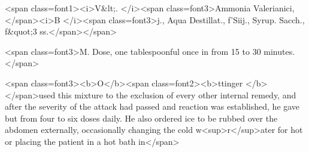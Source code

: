 <span class=font1><i>V&lt;.   </i><span class=font3>Ammonia Valerianici, </span><i>B </i><span class=font3>j.,
Aqua Destillat., f'Siij.,
Syrup. Sacch., f&quot;3 ss.</span></span>

<span class=font3>M.   Dose, one tablespoonful once in from 15 to 30 minutes.</span>

<span class=font3><b>O</b><span class=font2><b>ttinger </b></span>used this mixture to the exclusion of every other internal
remedy, and after the severity of the attack had passed and reaction
was established, he gave but from four to six doses daily. He also
ordered ice to be rubbed over the abdomen externally, occasionally
changing the cold w<sup>r</sup>ater for hot or placing the patient in a hot bath in</span>\endinput
